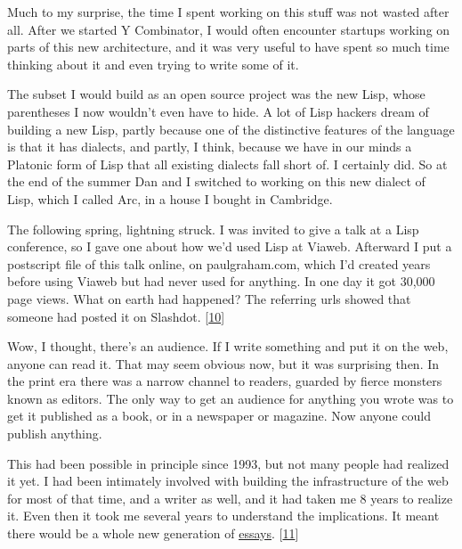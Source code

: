 Much to my
                  surprise, the time I spent working on this stuff was not
                  wasted after all. After we started Y Combinator, I would often
                  encounter startups working on parts of this new architecture,
                  and it was very useful to have spent so much time thinking
                  about it and even trying to write some of it.

The
                  subset I would build as an open source project was the new
                  Lisp, whose parentheses I now wouldn't even have to hide. A
                  lot of Lisp hackers dream of building a new Lisp, partly
                  because one of the distinctive features of the language is
                  that it has dialects, and partly, I think, because we have in
                  our minds a Platonic form of Lisp that all existing dialects
                  fall short of. I certainly did. So at the end of the summer
                  Dan and I switched to working on this new dialect of Lisp,
                  which I called Arc, in a house I bought in Cambridge.

The
                  following spring, lightning struck. I was invited to give a
                  talk at a Lisp conference, so I gave one about how we'd used
                  Lisp at Viaweb. Afterward I put a postscript file of this talk
                  online, on paulgraham.com, which I'd created years before
                  using Viaweb but had never used for anything. In one day it
                  got 30,000 page views. What on earth had happened? The
                  referring urls showed that someone had posted it on Slashdot.
                  [\href{\#f10n}{10}]

Wow, I thought, there's an audience. If I write
                  something and put it on the web, anyone can read it. That may
                  seem obvious now, but it was surprising then. In the print era
                  there was a narrow channel to readers, guarded by fierce
                  monsters known as editors. The only way to get an audience for
                  anything you wrote was to get it published as a book, or in a
                  newspaper or magazine. Now anyone could publish anything.

This
                  had been possible in principle since 1993, but not many people
                  had realized it yet. I had been intimately involved with
                  building the infrastructure of the web for most of that time,
                  and a writer as well, and it had taken me 8 years to realize
                  it. Even then it took me several years to understand the
                  implications. It meant there would be a whole new generation
                  of \href{http://www.paulgraham.com/essay.html}{\underline{essays}}.
                  [\href{\#f11n}{11}]

